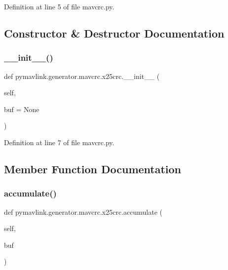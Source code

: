 Definition at line 5 of file mavcrc.\+py.



\subsection{Constructor \& Destructor Documentation}
\mbox{\label{classpymavlink_1_1generator_1_1mavcrc_1_1x25crc_ad5f749f0713c4fe42e5bca6eddda7346}} 
\subsubsection{\texorpdfstring{\_\_init\_\_()}{\_\_init\_\_()}}
{\footnotesize\ttfamily def pymavlink.\+generator.\+mavcrc.\+x25crc.\+\_\+\+\_\+init\+\_\+\+\_\+ (\begin{DoxyParamCaption}\item[{}]{self,  }\item[{}]{buf = {\ttfamily None} }\end{DoxyParamCaption})}



Definition at line 7 of file mavcrc.\+py.



\subsection{Member Function Documentation}
\mbox{\label{classpymavlink_1_1generator_1_1mavcrc_1_1x25crc_ae5f82c53cc694c92a3f612e06e259ae6}} 
\subsubsection{\texorpdfstring{accumulate()}{accumulate()}}
{\footnotesize\ttfamily def pymavlink.\+generator.\+mavcrc.\+x25crc.\+accumulate (\begin{DoxyParamCaption}\item[{}]{self,  }\item[{}]{buf }\end{DoxyParamCaption})}

